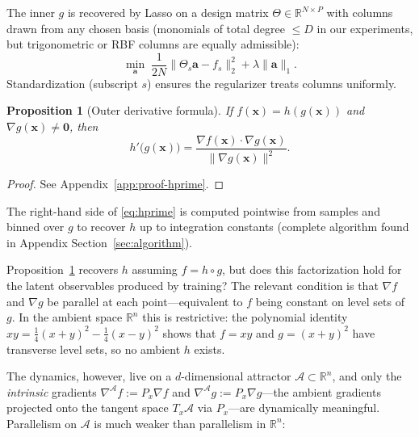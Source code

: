 \documentclass{article}
\newtheorem{proposition}{Proposition}
\newcommand{\R}{\mathbb{R}}
\newcommand{\x}{\bm{x}}
\begin{document}
The inner $g$ is recovered by Lasso on a design matrix $\Theta\in\R^{N\times P}$
with columns drawn from any chosen basis (monomials of total degree $\le D$
in our experiments, but trigonometric or RBF columns are equally admissible):
\begin{equation}
  \min_{\bm{a}}\;\frac{1}{2N}\|\Theta_s\bm{a}-f_s\|_2^2 + \lambda\|\bm{a}\|_1.
  \label{eq:lasso}
\end{equation}
Standardization (subscript $s$) ensures the regularizer treats columns
uniformly.

\begin{proposition}[Outer derivative formula]\label{prop:hprime}
If $f(\x)=h(g(\x))$ and $\nabla g(\x)\ne\bm{0}$, then
\begin{equation}
  h'\!\bigl(g(\x)\bigr)
    = \frac{\nabla f(\x)\cdot\nabla g(\x)}{\|\nabla g(\x)\|^2}.
  \label{eq:hprime}
\end{equation}
\end{proposition}
\begin{proof}
See Appendix~\ref{app:proof-hprime}.
\end{proof}

The right-hand side of \eqref{eq:hprime} is computed pointwise from samples and
binned over $g$ to recover $h$ up to integration constants (complete algorithm found in Appendix Section~\ref{sec:algorithm}).

Proposition~\ref{prop:hprime} recovers $h$ assuming $f = h\circ g$, but does
this factorization hold for the latent observables produced by training?
The relevant condition is that $\nabla f$ and $\nabla g$ be parallel at each
point---equivalent to $f$ being constant on level sets of $g$. In the ambient
space $\mathbb{R}^n$ this is restrictive: the polynomial identity
$xy = \tfrac{1}{4}(x+y)^2 - \tfrac{1}{4}(x-y)^2$ shows that $f = xy$ and
$g = (x+y)^2$ have transverse level sets, so no ambient $h$ exists. 

The dynamics, however, live on a $d$-dimensional attractor
$\mathcal{A}\subset\mathbb{R}^n$, and only the \emph{intrinsic} gradients
$\nabla^{\!\mathcal{A}} f := P_x\nabla f$ and
$\nabla^{\!\mathcal{A}} g := P_x\nabla g$---the ambient gradients projected
onto the tangent space $T_x\mathcal{A}$ via $P_x$---are dynamically
meaningful. Parallelism on $\mathcal{A}$ is much weaker than parallelism
in $\mathbb{R}^n$:
\end{document}
